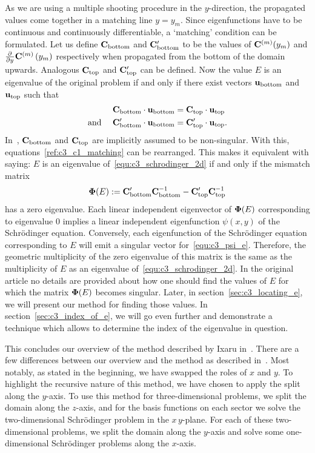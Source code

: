 As we are using a multiple shooting procedure in the $y$-direction, the propagated values come together in a matching line $y = y_m$. Since eigenfunctions have to be continuous and continuously differentiable, a `matching' condition can be formulated.  Let us define $\vb{C}_\text{bottom}$ and $\vb{C}_\text{bottom}'$ to be the values of $\vb{C}^{(m)}(y_m)$ and ${\pdv[]{}{y}}\vb{C}^{(m)}\left(y_m\right)$ respectively when propagated from the bottom of the domain upwards. Analogous $\vb{C}_\text{top}$ and $\vb{C}_\text{top}'$ can be defined. Now the value $E$ is an eigenvalue of the original problem if and only if there exist vectors $\vb{u}_\text{bottom}$ and $\vb{u}_\text{top}$ such that
\begin{align}
  \vb{C}_\text{bottom} \cdot \vb{u}_\text{bottom}                   & = \vb{C}_\text{top} \cdot \vb{u}_\text{top}           \nonumber                  \\
  \text{and }\quad \vb{C}_\text{bottom}' \cdot \vb{u}_\text{bottom} & = \vb{C}_\text{top}' \cdot \vb{u}_\text{top} \text{.} \label{ref:c3_c1_matching}
\end{align}
In~\cite{ixaru_new_2010}, $\vb{C}_\text{bottom}$ and $\vb{C}_\text{top}$ are implicitly assumed to be non-singular. With this, equations~\eqref{ref:c3_c1_matching} can be rearranged. This makes it equivalent with saying: $E$ is an eigenvalue of~\eqref{equ:c3_schrodinger_2d} if and only if the mismatch matrix
\begin{equation}\label{equ:c3_psi_e}
  \vb{\Phi}(E) := \vb{C}_\text{bottom}'\vb{C}_\text{bottom}^{-1} - \vb{C}_\text{top}'\vb{C}_\text{top}^{-1}
\end{equation}
has a zero eigenvalue. Each linear independent eigenvector of $\vb{\Phi}(E)$ corresponding to eigenvalue $0$ implies a linear independent eigenfunction $\psi(x, y)$ of the Schrödinger equation. Conversely, each eigenfunction of the Schrödinger equation corresponding to $E$ will emit a singular vector for~\eqref{equ:c3_psi_e}. Therefore, the geometric multiplicity of the zero eigenvalue of this matrix is the same as the multiplicity of $E$ as an eigenvalue of~\eqref{equ:c3_schrodinger_2d}. In the original article no details are provided about how one should find the values of $E$ for which the matrix $\vb{\Phi}(E)$ becomes singular. Later, in section~\ref{sec:c3_locating_e}, we will present our method for finding those values. In section~\ref{sec:c3_index_of_e}, we will go even further and demonstrate a technique which allows to determine the index of the eigenvalue in question.

This concludes our overview of the method described by Ixaru in~\cite{ixaru_new_2010}. There are a few differences between our overview and the method as described in~\cite{ixaru_new_2010}. Most notably, as stated in the beginning, we have swapped the roles of $x$ and $y$. To highlight the recursive nature of this method, we have chosen to apply the split along the $y$-axis. To use this method for three-dimensional problems, we split the domain along the $z$-axis, and for the basis functions on each sector we solve the two-dimensional Schrödinger problem in the $x\,y$-plane. For each of these two-dimensional problems, we split the domain along the $y$-axis and solve some one-dimensional Schrödinger problems along the $x$-axis.

